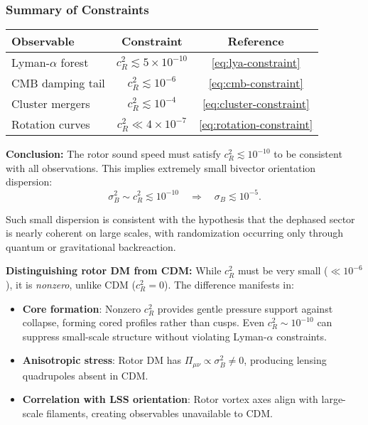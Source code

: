 \documentclass[11pt,a4paper]{article}
\numberwithin{equation}{section}
\theoremstyle{plain}
\theoremstyle{definition}
\theoremstyle{remark}
\begin{document}
\subsubsection{Summary of Constraints}

\begin{center}
\begin{tabular}{lcc}
\toprule
Observable & Constraint & Reference \\
\midrule
Lyman-$\alpha$ forest & $c_R^2 \lesssim 5 \times 10^{-10}$ & \eqref{eq:lya-constraint} \\
CMB damping tail & $c_R^2 \lesssim 10^{-6}$ & \eqref{eq:cmb-constraint} \\
Cluster mergers & $c_R^2 \lesssim 10^{-4}$ & \eqref{eq:cluster-constraint} \\
Rotation curves & $c_R^2 \ll 4 \times 10^{-7}$ & \eqref{eq:rotation-constraint} \\
\bottomrule
\end{tabular}
\end{center}

\textbf{Conclusion:} The rotor sound speed must satisfy $c_R^2 \lesssim 10^{-10}$ to be consistent with all observations. This implies extremely small bivector orientation dispersion:
\begin{equation}
\sigma_B^2 \sim c_R^2 \lesssim 10^{-10} \quad\Rightarrow\quad \sigma_B \lesssim 10^{-5}.
\end{equation}

Such small dispersion is consistent with the hypothesis that the dephased sector is nearly coherent on large scales, with randomization occurring only through quantum or gravitational backreaction.

\textbf{Distinguishing rotor DM from CDM:} While $c_R^2$ must be very small ($\ll 10^{-6}$), it is \emph{nonzero}, unlike CDM ($c_R^2 = 0$). The difference manifests in:
\begin{itemize}[leftmargin=*]
  \item \textbf{Core formation}: Nonzero $c_R^2$ provides gentle pressure support against collapse, forming cored profiles rather than cusps. Even $c_R^2 \sim 10^{-10}$ can suppress small-scale structure without violating Lyman-$\alpha$ constraints.
  \item \textbf{Anisotropic stress}: Rotor DM has $\Pi_{\mu\nu} \propto \sigma_B^2 \neq 0$, producing lensing quadrupoles absent in CDM.
  \item \textbf{Correlation with LSS orientation}: Rotor vortex axes align with large-scale filaments, creating observables unavailable to CDM.
\end{itemize}
\end{document}
